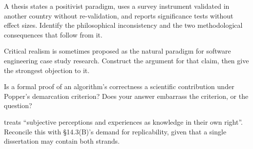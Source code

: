 \begin{reviewq}
  \item A thesis states a positivist paradigm, uses a survey instrument
    validated in another country without re-validation, and reports
    significance tests without effect sizes. Identify the philosophical
    inconsistency and the two methodological consequences that follow from it.
  \item Critical realism is sometimes proposed as the natural paradigm for
    software engineering case study research. Construct the argument for that
    claim, then give the strongest objection to it.
  \item Is a formal proof of an algorithm's correctness a scientific
    contribution under Popper's demarcation criterion? Does your answer
    embarrass the criterion, or the question?
  \item {} treats ``subjective perceptions and
    experiences as knowledge in their own right''. Reconcile this with
    \S14.3(B)'s demand for replicability, given that a single dissertation may
    contain both strands.
\end{reviewq}
